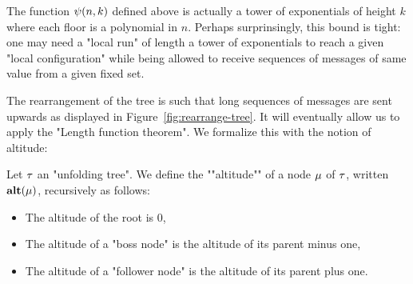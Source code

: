 \begin{remark}
	The function $\psi(n,k)$ defined above is actually a tower of exponentials of height $k$ where each floor is a polynomial in $n$. Perhaps surprinsingly, this bound is tight: one may need a "local run" of length a tower of exponentials to reach a given "local configuration" while being allowed to receive sequences of messages of same value from a given fixed set. 
\end{remark}


The rearrangement of the tree is such that long sequences of messages are sent upwards as displayed in Figure~\ref{fig:rearrange-tree}. It will eventually allow us to apply the "Length function theorem". 
We formalize this with the notion of altitude:

\begin{definition}
	Let $\tau$ an "unfolding tree". We define the ""altitude"" of a node $\mu$ of $\tau$, written $\mathbf{alt}(\mu)$, recursively as follows:
	\begin{itemize}
		\item The altitude of the root is $0$,
		\item The altitude of a "boss node" is the altitude of its parent minus one,
		\item The altitude of a "follower node" is the altitude of its parent plus one.
	\end{itemize}
\end{definition}

